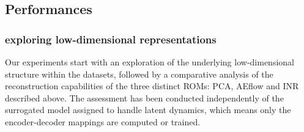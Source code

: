 \documentclass{article}
\begin{document}
\subsection{Performances}
\subsubsection{exploring low-dimensional representations}
Our experiments start with an exploration of the underlying low-dimensional structure within the datasets, followed by a comparative analysis of the reconstruction capabilities of the three distinct ROMs: PCA, AEflow and INR described above. The assessment has been conducted independently of the surrogated model assigned to handle latent dynamics, which means only the encoder-decoder mappings are computed or trained.
\end{document}
